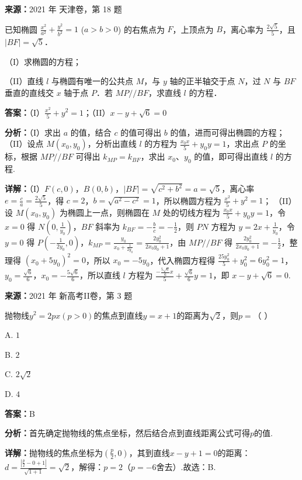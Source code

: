 \begin{question}[points=15]
\textbf{来源：}2021 年 天津卷，第 18 题\par
已知椭圆 $\frac{x^2}{a^2} + \frac{y^2}{b^2} = 1$ ($a > b > 0$) 的右焦点为 $F$，上顶点为 $B$，离心率为 $\frac{2\sqrt{5}}{5}$，且 $|BF| = \sqrt{5}$．

（I）求椭圆的方程；

（II）直线 $l$ 与椭圆有唯一的公共点 $M$，与 $y$ 轴的正半轴交于点 $N$，过 $N$ 与 $BF$ 垂直的直线交 $x$ 轴于点 $P$．若 $MP // BF$，求直线 $l$ 的方程．
\begin{solution}
\textbf{答案：}（I）$\frac{x^2}{5} + y^2 = 1$；（II）$x - y + \sqrt{6} = 0$

\textbf{分析：}（I）求出 $a$ 的值，结合 $c$ 的值可得出 $b$ 的值，进而可得出椭圆的方程；
（II）设点 $M(x_0,y_0)$，分析出直线 $l$ 的方程为 $\frac{x_0 x}{5} + y_0 y = 1$，求出点 $P$ 的坐标，根据 $MP // BF$ 可得出 $k_{MP} = k_{BF}$，求出 $x_0$、$y_0$ 的值，即可得出直线 $l$ 的方程.

\textbf{详解：}（I）$F(c,0)$，$B(0,b)$，$|BF| = \sqrt{c^2+b^2} = a = \sqrt{5}$，离心率 $e = \frac{c}{a} = \frac{2\sqrt{5}}{5}$，得 $c=2$，$b = \sqrt{a^2-c^2} = 1$，所以椭圆方程为 $\frac{x^2}{5} + y^2 = 1$；
（II）设 $M(x_0,y_0)$ 为椭圆上一点，则椭圆在 $M$ 处的切线方程为 $\frac{x_0 x}{5} + y_0 y = 1$，令 $x=0$ 得 $N\left(0,\frac{1}{y_0}\right)$，$BF$ 斜率为 $k_{BF} = -\frac{b}{c} = -\frac{1}{2}$，则 $PN$ 方程为 $y = 2x + \frac{1}{y_0}$，令 $y=0$ 得 $P\left(-\frac{1}{2y_0},0\right)$，$k_{MP} = \frac{y_0}{x_0+\frac{1}{2y_0}} = \frac{2y_0^2}{2x_0 y_0+1}$，由 $MP // BF$ 得 $\frac{2y_0^2}{2x_0 y_0+1} = -\frac{1}{2}$，整理得 $(x_0+5y_0)^2=0$，所以 $x_0 = -5y_0$，代入椭圆方程得 $\frac{25y_0^2}{5}+y_0^2=6y_0^2=1$，$y_0 = \frac{\sqrt{6}}{6}$，$x_0 = -\frac{5\sqrt{6}}{6}$，所以直线 $l$ 方程为 $\frac{-\frac{5\sqrt{6}}{6}x}{5} + \frac{\sqrt{6}}{6}y = 1$，即 $x - y + \sqrt{6}=0$.
\end{solution}
\end{question}

\begin{question}[points=5]
\textbf{来源：}2021 年 新高考II卷，第 3 题\par
抛物线$y^2=2px(p>0)$的焦点到直线$y=x+1$的距离为$\sqrt{2}$，则$p=$（ ）
\begin{choices}
  \item A. $1$
  \item B. $2$
  \item C. $2\sqrt{2}$
  \item D. $4$
\end{choices}
\begin{solution}
\textbf{答案：}B

\textbf{分析：}首先确定抛物线的焦点坐标，然后结合点到直线距离公式可得$p$的值.

\textbf{详解：}抛物线的焦点坐标为$(\frac{p}{2},0)$，其到直线$x-y+1=0$的距离：$d=\frac{|\frac{p}{2}-0+1|}{\sqrt{1+1}}=\sqrt{2}$，解得：$p=2$（$p=-6$舍去）.故选：B.
\end{solution}
\end{question}

